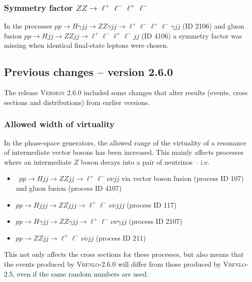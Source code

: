 \documentclass[english,12pt]{article}
\begin{document}
\subsubsection{Symmetry factor $ZZ \rightarrow \ell^{+} \ell^{-} \ell^{+} \ell^{-}$ }

In the processes $pp \rightarrow H \gamma jj \rightarrow ZZ \gamma jj \rightarrow \ell^{+} 
\ell^{-} \ell^{+} \ell^{-} \gamma jj$ (ID 2106) and gluon fusion $pp \rightarrow H jj \rightarrow 
ZZ jj \rightarrow \ell^{+} \ell^{-} \ell^{+} \ell^{-} jj $ (ID 4106) a symmetry factor was missing 
when identical final-state leptons were chosen.



\subsection{Previous changes -- version 2.6.0}

The release \textsc{Version 2.6.0} included some changes 
that alter results (events, cross sections and distributions) from earlier versions.

\subsubsection{Allowed width of virtuality}
In the phase-space generators, the allowed range of the virtuality of a resonance of intermediate vector bosons has been increased.  This mainly affects processes where an intermediate $Z$ boson decays into a pair of neutrinos -- i.e.
\begin{itemize}
 \item \ $pp \rightarrow Hjj \rightarrow ZZjj \rightarrow \ell^{+} \ell^{-} \nu \overline{\nu} jj$ via vector boson fusion (process ID 107) and gluon fusion (process ID 4107)
 \item $pp \rightarrow Hjjj \rightarrow ZZjjj \rightarrow \ell^{+} \ell^{-} \nu \overline{\nu} jjj$ (process ID 117)
 \item $pp \rightarrow H\gamma jj \rightarrow ZZ\gamma jj \rightarrow \ell^{+} \ell^{-} \nu \overline{\nu} \gamma jj$ (process ID 2107)
 \item $pp \rightarrow ZZjj \rightarrow \ell^{+} \ell^{-} \nu \overline{\nu} jj$ (process ID 211)
\end{itemize}
This not only affects the cross sections for these processes, but also means that the events produced by \textsc{Vbfnlo-2.6.0} will differ from those produced by \textsc{Vbfnlo-2.5}, even if the same random numbers are used.
\end{document}

